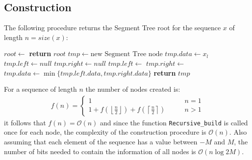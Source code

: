 \documentclass{article}
\begin{document}
\subsection{Construction}
The following procedure returns the Segment Tree root for the sequence $x$ of length $n=\mathit{size}(x)$:
    \begin{algorithmic}[1]
        \State $\mathit{root}\gets$
        \State \textbf{return} $root$
    \EndProcedure
    \State
        \State $\mathit{tmp}\gets\text{new Segment Tree node}$
            \State $\mathit{tmp.data}\gets x_l$
            \State $\mathit{tmp.left}\gets \mathit{null}$
            \State $\mathit{tmp.right}\gets \mathit{null}$
        \Else
            \State $\mathit{tmp.left}\gets$
            \State $\mathit{tmp.right}\gets$
            \State $\mathit{tmp.data}\gets\min\{\mathit{tmp.left.data},\mathit{tmp.right.data}\}$
        \EndIf
        \State \textbf{return} $\mathit{tmp}$
    \EndFunction
    \end{algorithmic}
For a sequence of length $n$ the number of nodes created is:
    \begin{align*}
        f(n)=
        \begin{cases}
            1 \qquad &n=1 \\
            1+f(\left\lfloor{\frac{n}{2}}\right\rfloor)+f(\left\lceil{\frac{n}{2}}\right\rceil) \qquad &n>1
        \end{cases}
    \end{align*}
it follows that $f(n)=\mathcal{O}(n)$ and since the function \texttt{Recursive\_build} is called once for each node, the complexity of the construction procedure is $\mathcal{O}(n)$. Also assuming that each element of the sequence has a value between $-M$ and $M$, the number of bits needed to contain the information of all nodes is $\mathcal{O}(n\log{2M})$.
\end{document}
